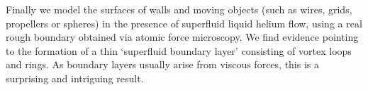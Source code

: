 Finally we model the surfaces of walls and moving objects (such as wires, grids, propellers or spheres) in the presence of superfluid liquid helium flow, using a real rough boundary obtained via atomic force microscopy. We find evidence pointing to the formation of a thin `superfluid boundary layer' consisting of 
vortex loops and rings. As boundary layers usually arise from viscous forces, this is a surprising and intriguing result.
\thispagestyle{empty}
